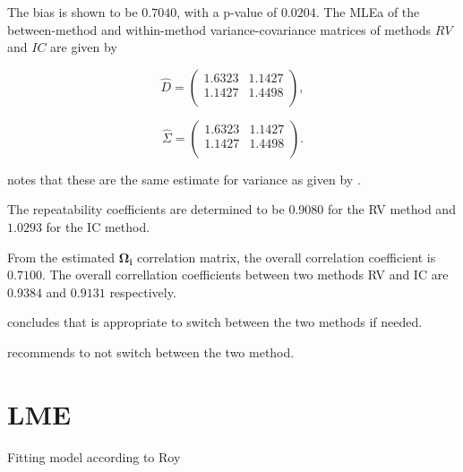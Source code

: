 \documentclass[12pt, a4paper]{report}
\theoremstyle{plain}
\theoremstyle{definition}
\theoremstyle{remark}
\begin{document}
	The bias is shown to be $0.7040$, with a p-value of $0.0204$. The MLEa of the between-method and within-method variance-covariance matrices of methods $RV$ and $IC$ are given by
	
	\begin{equation}\hat{D}=\left(
	\begin{array}{cc}
	1.6323 & 1.1427 \\
	1.1427 & 1.4498 \\
	\end{array}
	\right),
	\end{equation}
	
	
	
	\begin{equation}\hat{\Sigma}=\left(
	\begin{array}{cc}
	1.6323 & 1.1427 \\
	1.1427 & 1.4498 \\
	\end{array}
	\right).
	\end{equation}
	
	\citet{roy} notes that these are the same estimate for variance as given by \citet{BA99}.
	
	
	The repeatability coefficients are determined to be $0.9080$ for the RV method and $1.0293$ for the IC method.
	
	From the estimated $\boldsymbol{\Omega_{i}}$ correlation matrix, the overall correlation coefficient is $0.7100$.
	The overall correllation coefficients between two methods RV and IC are $0.9384$ and $0.9131$ respectively.
	
	\citet{roy} concludes that is appropriate to switch between the two methods if needed.
	
	
	\citet{haber}
	
	\citet{roy} recommends to not switch between the two method.
	
	\section{LME}
	
	Fitting model according to Roy
	
\end{document}
